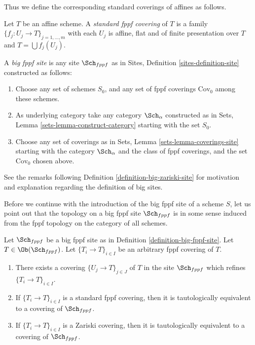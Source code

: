\noindent
Thus we define the corresponding standard coverings of affines as follows.

\begin{definition}
\label{definition-standard-fppf}
Let $T$ be an affine scheme. A {\it standard fppf covering}
of $T$ is a family $\{f_j : U_j \to T\}_{j = 1, \ldots, m}$
with each $U_j$ is affine, flat and of finite presentation over $T$
and $T = \bigcup f_j(U_j)$.
\end{definition}

\begin{definition}
\label{definition-big-fppf-site}
A {\it big fppf site} is any site $\Sch_{fppf}$ as in
Sites, Definition \ref{sites-definition-site} constructed as follows:
\begin{enumerate}
\item Choose any set of schemes $S_0$, and any set of fppf coverings
$\text{Cov}_0$ among these schemes.
\item As underlying category take any category $\Sch_\alpha$
constructed as in Sets, Lemma \ref{sets-lemma-construct-category}
starting with the set $S_0$.
\item Choose any set of coverings as in
Sets, Lemma \ref{sets-lemma-coverings-site} starting with the
category $\Sch_\alpha$ and the class of fppf coverings,
and the set $\text{Cov}_0$ chosen above.
\end{enumerate}
\end{definition}

\noindent
See the remarks following Definition \ref{definition-big-zariski-site}
for motivation and explanation regarding the definition of big sites.

\medskip\noindent
Before we continue with the introduction of the big fppf site of
a scheme $S$, let us point out that the topology on a big fppf site
$\Sch_{fppf}$ is in some sense induced from the fppf topology
on the category of all schemes.

\begin{lemma}
\label{lemma-fppf-induced}
Let $\Sch_{fppf}$ be a big fppf site as in
Definition \ref{definition-big-fppf-site}.
Let $T \in \Ob(\Sch_{fppf})$.
Let $\{T_i \to T\}_{i \in I}$ be an arbitrary fppf covering of $T$.
\begin{enumerate}
\item There exists a covering $\{U_j \to T\}_{j \in J}$ of $T$ in the site
$\Sch_{fppf}$ which refines $\{T_i \to T\}_{i \in I}$.
\item If $\{T_i \to T\}_{i \in I}$ is a standard fppf covering, then
it is tautologically equivalent to a covering of $\Sch_{fppf}$.
\item If $\{T_i \to T\}_{i \in I}$ is a Zariski covering, then
it is tautologically equivalent to a covering of $\Sch_{fppf}$.
\end{enumerate}
\end{lemma}

